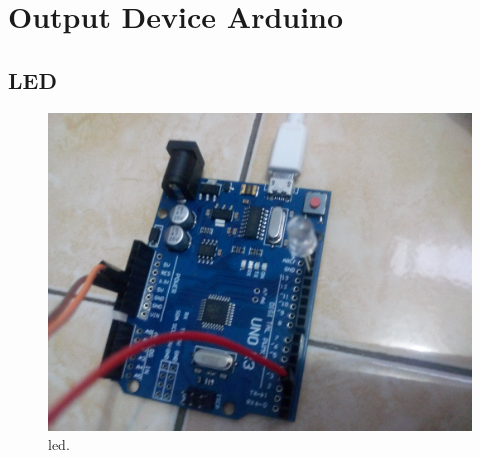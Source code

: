 \section{Output Device Arduino}
\subsection{LED}

\begin{figure}[ht]
	\centerline{\includegraphics[width=1\textwidth]{figures/led.JPG}}
	\caption{led.}
	\label{LED}
\end{figure}


